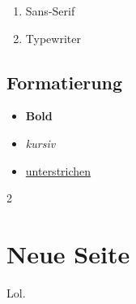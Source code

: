 \documentclass{article}
\begin{document}
\begin{enumerate}
	\item {\sffamily Sans-Serif}
	\item {\ttfamily Typewriter}
\end{enumerate}

\subsection{Formatierung}

\begin{itemize}
	\item {\bfseries Bold}
	\item {\itshape kursiv}
	\item \underline{unterstrichen}
\end{itemize}

\newpage

\begin{multicols}{2}

\section{Neue Seite}

Lol.
\lipsum[1-2]

\end{multicols}
\end{document}
